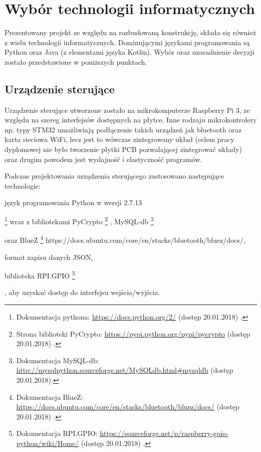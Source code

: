 \newpage\section{Wybór technologii informatycznych} \label{sec:technologie}
Prezentowany projekt ze względu na rozbudowaną konstrukcję, składa się również z wielu technologii informatycznych. Dominującymi językami programowania są Python oraz Java (z elementami języka Kotlin). Wybór oraz uzasadnienie decyzji zostało przedstawione w poniższych punktach.

\subsection{Urządzenie sterujące}
Urządzenie sterujące utworzone zostało na mikrokomputerze Raspberry Pi 3, ze względu na szereg interfejsów dostępnych na płytce. Inne rodzaju mikrokontrolery np. typy STM32 umożliwiają podłączenie takich urządzeń jak bluetooth oraz karta sieciowa WiFi, lecz jest to wówczas zintegrowany układ (celem pracy dyplomowej nie było tworzenie płytki PCB pozwalającej zintegrować układy) oraz drugim powodem jest wydajność i elastyczność programów. 

Podczas projektowania urządzenia sterującego zastosowano następujące technologie:
\begin{itemize*}
	\item język programowania Python w wersji 2.7.13
	
	\footnote{ Dokumentacja pythona:
	\href {	https://docs.python.org/2/} 
	{	https://docs.python.org/2/} (dostęp 20.01.2018) 
	.}
	 wraz z bibliotekami PyCrypto
	 \footnote{ Strona biblioteki PyCrypto:
	 	\href {	https://pypi.python.org/pypi/pycrypto} 
	 	{	https://pypi.python.org/pypi/pycrypto} (dostęp 20.01.2018) 
	 	.}
	 , MySQL-db
	 \footnote{ Dokumentacja MySQL-db:
	 	\href {	http://mysql-python.sourceforge.net/MySQLdb.html\#mysqldb} 
	 	{	http://mysql\-python.sourceforge.net/MySQLdb.html\#mysqldb} (dostęp 20.01.2018).}
	 
	  oraz BlueZ
	  \footnote{ Dokumentacja BlueZ:
	 	\href {	https://docs.ubuntu.com/core/en/stacks/bluetooth/bluez/docs/} 
	 	{	https://docs.ubuntu.com/core/en/stacks/bluetooth/bluez/docs/} (dostęp 20.01.2018) 
	 	.}
	 https://docs.ubuntu.com/core/en/stacks/bluetooth/bluez/docs/,
	\item format zapisu danych JSON,
	\item biblioteka RPI.GPIO
	 \footnote{ Dokumentacja RPI.GPIO:
		\href {	https://sourceforge.net/p/raspberry-gpio-python/wiki/Home/} 
		{	https://sourceforge.net/p/raspberry-gpio-python/wiki/Home/} (dostęp 20.01.2018) 
		.}
	
	, aby uzyskać dostęp do interfejsu wejścia/wyjścia.
\end{itemize*}

